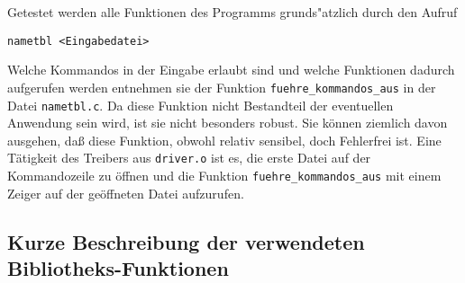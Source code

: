 Getestet werden alle Funktionen des Programms grunds"atzlich durch den
Aufruf 
\begin{verbatim}
nametbl <Eingabedatei>
\end{verbatim}
Welche Kommandos in der Eingabe erlaubt sind und welche Funktionen
dadurch aufgerufen werden entnehmen sie der Funktion 
{\tt fuehre\_kommandos\_aus} in der Datei {\tt nametbl.c}.
Da diese Funktion nicht Bestandteil der eventuellen Anwendung sein
wird, ist sie nicht besonders robust.
Sie k\"onnen ziemlich davon ausgehen, da{\ss} diese Funktion, obwohl
relativ sensibel, doch Fehlerfrei ist.
Eine T\"atigkeit des Treibers aus {\tt driver.o} ist es, 
die erste Datei auf der Kommandozeile zu \"offnen 
und die Funktion {\tt fuehre\_kommandos\_aus} mit einem Zeiger 
auf der ge\"offneten Datei aufzurufen. 


\subsection*{Kurze Beschreibung der verwendeten Bibliotheks-Funktionen}

